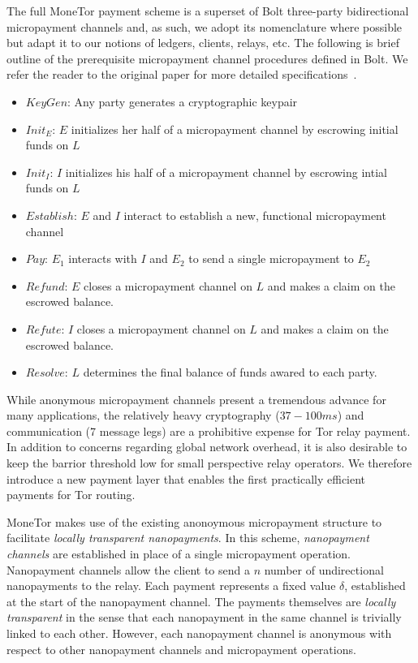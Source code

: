 The full MoneTor payment scheme is a superset of Bolt three-party bidirectional
micropayment channels and, as such, we adopt its nomenclature where possible but
adapt it to our notions of ledgers, clients, relays, etc. The following is brief
outline of the prerequisite micropayment channel procedures defined in Bolt. We
refer the reader to the original paper for more detailed
specifications~\cite{green2017bolt}.

\begin{itemize}
\item $KeyGen$: Any party generates a cryptographic keypair
\item $Init_E$: $E$ initializes her half of a micropayment channel by escrowing
  initial funds on $L$
\item $Init_I$: $I$ initializes his half of a micropayment channel by
  escrowing intial funds on $L$
\item $Establish$: $E$ and $I$ interact to establish a new, functional
  micropayment channel
\item $Pay$: $E_1$ interacts with $I$ and $E_2$ to send a single micropayment to $E_2$
\item $Refund$: $E$ closes a micropayment channel on $L$ and makes a claim on
  the escrowed balance.
\item $Refute$: $I$ closes a micropayment channel on $L$ and makes a claim on
  the escrowed balance.
\item $Resolve$: $L$ determines the final balance of funds awared to
  each party.
\end{itemize}

While anonymous micropayment channels present a tremendous advance for many
applications, the relatively heavy cryptography ($37-100 ms$) and communication
(7 message legs) are a prohibitive expense for Tor relay payment. In addition to
concerns regarding global network overhead, it is also desirable to keep the
barrior threshold low for small perspective relay operators. We therefore
introduce a new payment layer that enables the first practically efficient
payments for Tor routing.

MoneTor makes use of the existing anonoymous micropayment structure to
facilitate \emph{locally transparent nanopayments}. In this scheme,
\emph{nanopayment channels} are established in place of a single micropayment
operation. Nanopayment channels allow the client to send a $n$ number of
undirectional nanopayments to the relay. Each payment represents a fixed value
$\delta$, established at the start of the nanopayment channel. The payments
themselves are \emph{locally transparent} in the sense that each nanopayment in
the same channel is trivially linked to each other. However, each nanopayment
channel is anonymous with respect to other nanopayment channels and micropayment
operations.

